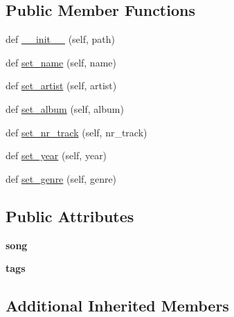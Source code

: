 \subsection*{Public Member Functions}
\begin{DoxyCompactItemize}
\item 
def \hyperlink{classhal_1_1files_1_1models_1_1_m_p3_song_a4f37efc2f666bf142bb1ed2370244fef}{\+\_\+\+\_\+init\+\_\+\+\_\+} (self, path)
\item 
def \hyperlink{classhal_1_1files_1_1models_1_1_m_p3_song_ae4f958b7afa7212cff8470163854a0ed}{set\+\_\+name} (self, name)
\item 
def \hyperlink{classhal_1_1files_1_1models_1_1_m_p3_song_abecb2c34045dbd2133e898114198d518}{set\+\_\+artist} (self, artist)
\item 
def \hyperlink{classhal_1_1files_1_1models_1_1_m_p3_song_afda62b2b1519b7bc65e8cd98d8f2e2bf}{set\+\_\+album} (self, album)
\item 
def \hyperlink{classhal_1_1files_1_1models_1_1_m_p3_song_a6b456dde38763b13fb10266b7910b63f}{set\+\_\+nr\+\_\+track} (self, nr\+\_\+track)
\item 
def \hyperlink{classhal_1_1files_1_1models_1_1_m_p3_song_ac14c40460b53a47979a58864409a366c}{set\+\_\+year} (self, year)
\item 
def \hyperlink{classhal_1_1files_1_1models_1_1_m_p3_song_a36a9fd62c8251b47d192a46b0f812c51}{set\+\_\+genre} (self, genre)
\end{DoxyCompactItemize}
\subsection*{Public Attributes}
\begin{DoxyCompactItemize}
\item 
{\bfseries song}\hypertarget{classhal_1_1files_1_1models_1_1_m_p3_song_a767b9af9e2e01ce942a44cfa7cda2653}{}\label{classhal_1_1files_1_1models_1_1_m_p3_song_a767b9af9e2e01ce942a44cfa7cda2653}

\item 
{\bfseries tags}\hypertarget{classhal_1_1files_1_1models_1_1_m_p3_song_a57a2d42a3326e55f553c1a79678dd6b5}{}\label{classhal_1_1files_1_1models_1_1_m_p3_song_a57a2d42a3326e55f553c1a79678dd6b5}

\end{DoxyCompactItemize}
\subsection*{Additional Inherited Members}


